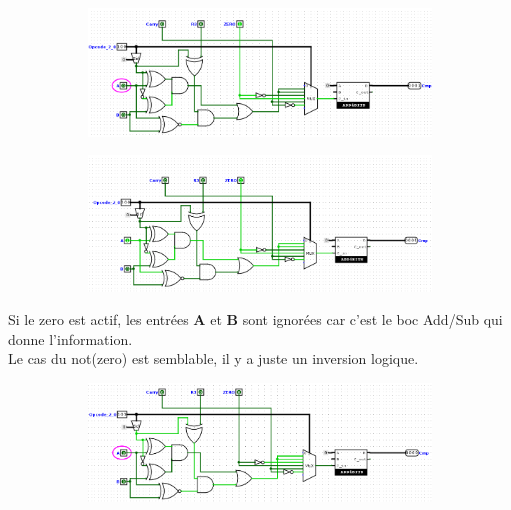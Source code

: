 \documentclass[a4paper]{article}
\begin{document}
\begin{tcolorbox}[colframe=Monokaimagenta,colback=white]
\begin{figure}[H]
    \begin{subfigure}{.7\textwidth}
        \centering
        \includegraphics[width=.8\linewidth]{src/COMP_TEST_AegB1.png}
        \label{fig:COMPARATEUR_l_EXEMPLE}
   \end{subfigure}
   
   \begin{subfigure}{.7\textwidth}
        \centering
        \includegraphics[width=.8\linewidth]{src/COMP_TEST_AegB.png}
        \label{fig:COMPARATEUR_l_EXEMPLE_1}
   \end{subfigure}


\end{figure}

Si le zero est actif, les entrées \textbf{A} et \textbf{B} sont ignorées car c'est le boc Add/Sub qui donne l'information.\\
Le cas du not(zero) est semblable, il y a juste un inversion logique.

\smallskip

\begin{figure}[H]
    \centering
    
    \begin{subfigure}{.7\textwidth}
        \centering
        \includegraphics[width=.8\linewidth]{src/COMP_TEST_AcarB.png}
        \label{fig:COMPARATEUR_l_EXEMPLE}
   \end{subfigure}
   

\end{figure}
\end{tcolorbox}
\end{document}
